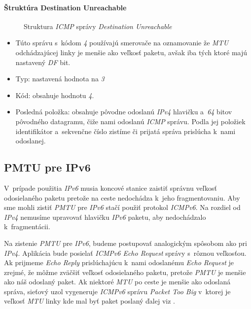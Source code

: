 \documentclass[12pt,a4paper,titlepage]{article}
\begin{document}
    \paragraph{Štruktúra Destination Unreachable}
    \begin{figure}[h!]
        \begin{center}
            \caption{Struktura \emph{ICMP} správy \emph{Destination Unreachable}} 
            \label{icmp_des_unreachable}
        \end{center}
     \end{figure}
    
    \begin{itemize}
        \item Túto správu s~kódom \emph{4} používajú smerovače na oznamovanie že \emph{MTU}
            odchádzajúcej linky je menšie ako veľkosť paketu, avšak iba 
            tých ktoré majú nastavený \emph{DF} bit.
        \item Typ: nastavená hodnota na \emph{3}
        \item Kód: obsahuje hodnotu \emph{4}.
        \item Posledná položka: obsahuje pôvodne odoslanú \emph{IPv4} hlavičku
a~\emph{64} bitov pôvodného datagramu, čiže nami odoslanú \emph{ICMP} správu.
            Podla jej položiek identifikátor a~sekvenčne číslo zistíme
            či prijatá správa prislúcha k~nami odoslanej.
    \end{itemize}

    \subsection{PMTU pre IPv6}
        V~prípade použitia \emph{IPv6} musia koncové stanice zaistiť správnu
        veľkosť odosielaného paketu pretože na ceste nedochádza k~jeho fragmentovaniu.
        Aby sme mohli zistiť \emph{PMTU} pre \emph{IPv6} stačí použiť protokol
        \emph{ICMPv6}. Na rozdiel od \emph{IPv4} nemusíme upravovať hlavičku \emph{IPv6} 
        paketu, aby nedochádzalo k~fragmentácii.

        Na zistenie \emph{PMTU} pre \emph{IPv6}, budeme postupovať analogickým spôsobom
        ako pri \emph{IPv4}. Aplikácia bude posielať \emph{ICMPv6 Echo Request} správy s~rôznou veľkosťou.
        Ak prijmeme \emph{Echo Reply} prislúchajúcu k~nami odoslanému \emph{Echo Request} je
        zrejmé, že môžme zväčšiť veľkosť odosielaného paketu, pretože \emph{PMTU} 
        je menšie ako náš odoslaný paket.
        Ak niektoré \emph{MTU} po ceste je menšie ako odoslaná správa, sieťový uzol vygeneruje 
        \emph{ICMPv6} správu \emph{Packet Too Big} v~ktorej je veľkosť \emph{MTU} linky
        kde mal byť paket poslaný ďalej viz \cite{rfc_pmtuv6}.
\end{document}
